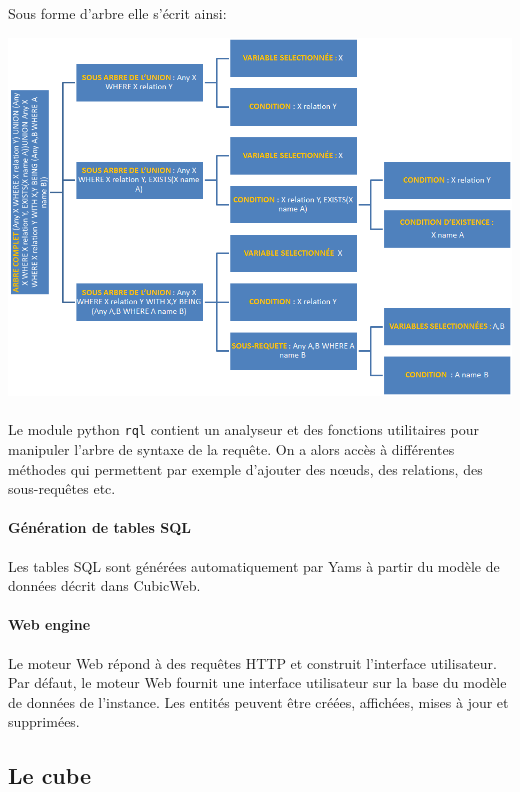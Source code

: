 \documentclass {report}
\begin{document}
Sous forme d'arbre elle s'écrit ainsi:
\begin{center}
\includegraphics[scale=0.7]{graph.png}
\end{center}

\paragraph{}
Le module python \verb+rql+ contient un analyseur et des fonctions utilitaires pour manipuler l'arbre de syntaxe de la requête. On a alors accès à différentes méthodes qui permettent par exemple d'ajouter des nœuds, des relations, des sous-requêtes etc.


\paragraph{Génération de tables SQL}
Les tables SQL sont générées automatiquement par Yams à partir du modèle de données décrit dans CubicWeb.

\paragraph{Web engine}
Le moteur Web répond à des requêtes HTTP et construit l'interface utilisateur. Par défaut, le moteur Web fournit une interface utilisateur sur la base du modèle de données de l'instance. Les entités peuvent être créées, affichées, mises à jour et supprimées. 

\subsection{Le cube}
\end{document}
